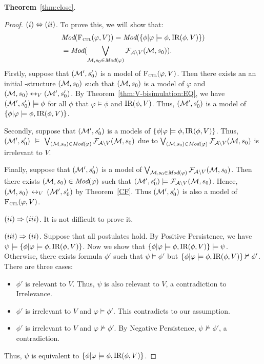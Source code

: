 \documentclass{article}
\begin{document}
\textbf{Theorem}~\ref{thm:close}.
\begin{proof}
$(i) \Leftrightarrow (ii)$. To prove this, we will show that:
\begin{align*}
 & \textit{Mod}({\textsc{F}_{\textsc{ctl}}}(\varphi, V)) = \textit{Mod}(\{\phi | \varphi \models \phi, \textrm{IR}(\phi, V)\})\\
 & = \textit{Mod}(\bigvee_{{\cal M}, s_0\in \textit{Mod}(\varphi)} {\cal F}_{{\cal A}\setminus V}({\cal M}, s_0)).
\end{align*}
Firstly, suppose that $({\cal M}', s_0')$ is a model of ${\textsc{F}_{\textsc{ctl}}}(\varphi, V)$. Then there exists an  an initial \MPK-structure $({\cal M}, s_0)$ such that $({\cal M}, s_0)$ is a model of $\varphi$ and $({\cal M}, s_0) \leftrightarrow_V ({\cal M}', s_0')$. By Theorem~\ref{thm:V-bisimulation:EQ}, we have $({\cal M}', s_0') \models \phi$ for all $\phi$ that $\varphi\models \phi$ and $\textrm{IR}(\phi, V)$. Thus, $({\cal M}', s_0')$ is a model of $\{\phi | \varphi \models \phi, \textrm{IR}(\phi, V)\}$.

Secondly, suppose that $({\cal M}', s_0')$ is a models of $\{\phi | \varphi \models \phi, \textrm{IR}(\phi, V)\}$. Thus, $({\cal M}', s_0')$ $\models$ $\bigvee_{({\cal M}, s_0)\in \textit{Mod}(\varphi)} {\cal F}_{{\cal A}\setminus V}({\cal M}, s_0)$ due to $\bigvee_{({\cal M}, s_0)\in \textit{Mod}(\varphi)} {\cal F}_{{\cal A}\setminus V}({\cal M}, s_0)$ is irrelevant to $V$.

Finally, suppose that $({\cal M}', s_0')$ is a model of $\bigvee_{{\cal M}, s_0\in \textit{Mod}(\varphi)} {\cal F}_{{\cal A}\setminus V}({\cal M}, s_0)$. Then there exists $({\cal M}, s_0) \in \textit{Mod}(\varphi)$ such that $({\cal M}', s_0') \models {\cal F}_{{\cal A}\setminus V}({\cal M}, s_0)$. Hence, $({\cal M}, s_0)$ $\leftrightarrow_V$ $({\cal M}', s_0')$ by Theorem~\ref{CF}. Thus $({\cal M}', s_0')$ is also a model of ${\textsc{F}_{\textsc{ctl}}}(\varphi,V)$.


$(ii)\Rightarrow (iii)$. It is not difficult to prove it.

$(iii)\Rightarrow (ii)$. Suppose that all postulates hold. By Positive Persistence, we have $\psi \models \{\phi | \varphi \models \phi, \textrm{IR}(\phi, V)\}$. Now
we show that $\{\phi | \varphi \models \phi, \textrm{IR}(\phi, V)\} \models \psi$. Otherwise, there exists formula $\phi'$ such that $\psi \models \phi'$ but $\{\phi | \varphi \models \phi, \textrm{IR}(\phi, V)\} \nvDash \phi'$. There are three cases:
\begin{itemize}
  \item $\phi'$ is relevant to $V$. Thus, $\psi$ is also relevant to $V$, a contradiction to Irrelevance.
  \item $\phi'$ is irrelevant to $V$ and $\varphi \models \phi'$. This contradicts to our assumption.
  \item $\phi'$ is irrelevant to $V$ and $\varphi \nvDash \phi'$. By Negative Persistence, $\psi \nvDash \phi'$, a contradiction.
\end{itemize}
Thus, $\psi$ is equivalent to $\{\phi | \varphi \models \phi, \textrm{IR}(\phi, V)\}$.
\end{proof}
\end{document}
